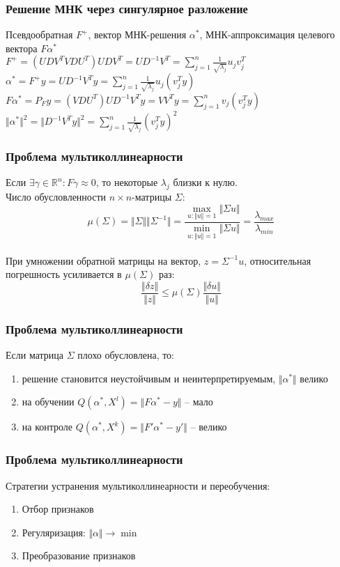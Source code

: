 \documentclass[12pt]{beamer}
\begin{document}
\begin{frame}\frametitle{Решение МНК через сингулярное разложение}
Псевдообратная $F^+$, вектор МНК-решения $\alpha^*$,
МНК-аппроксимация целевого вектора $F\alpha^*$\\
$F^+ = (UDV^TVDU^T)UDV^T = UD^{-1}V^T = \sum\limits_{j=1}^n \frac{1}{\sqrt{\lambda_j}}  u_j v_j^T$\\
$ \alpha^* = F^+y = UD^{-1}V^Ty = \sum\limits_{j=1}^n \frac{1}{\sqrt{\lambda_j}}  u_j (v_j^Ty)$\\
$F \alpha^* = P_F y = (VDU^T)UD^{-1}V^Ty = VV^Ty = \sum\limits_{j=1}^n v_j (v_j^Ty)$\\
$\Vert \alpha^* \Vert^2  = \Vert D^{-1}V^Ty \Vert^2 = \sum\limits_{j=1}^n \frac{1}{\sqrt{\lambda_j}} (v_j^Ty)^2$
\end{frame}

\begin{frame}\frametitle{Проблема мультиколлинеарности}
Если $\exists \gamma \in \mathbb{R}^n: F\gamma \approx 0$, то некоторые $\lambda_j$ близки к нулю.\\
Число обусловленности $n \times n$-матрицы $\Sigma$:
$$\mu(\Sigma) = \Vert \Sigma \Vert \Vert \Sigma^{-1} \Vert = \frac{\max\limits_{u: \Vert u \Vert = 1} \Vert \Sigma u \Vert}{\min\limits_{u: \Vert u \Vert = 1} \Vert \Sigma u \Vert} = \frac{\lambda_{max}}{\lambda_{min}}$$\\
При умножении обратной матрицы на вектор, $z = \Sigma^{-1}u$, относительная погрешность усиливается в $\mu(\Sigma)$ раз:\\
$$\frac{\Vert \delta z \Vert}{\Vert z \Vert } \leq \mu(\Sigma) \frac{\Vert \delta u \Vert}{\Vert u \Vert }$$
\end{frame}

\begin{frame}\frametitle{Проблема мультиколлинеарности}
Если матрица $\Sigma$ плохо обусловлена, то: %
\begin{enumerate}[--]
\item решение становится неустойчивым и неинтерпретируемым, $\Vert \alpha^* \Vert $ велико
\item на обучении $Q(\alpha^*, X^l) = \Vert F\alpha^* -y \Vert$ -- мало   %
\item на контроле $Q(\alpha^*, X^k) = \Vert F'\alpha^* -y' \Vert$ -- велико
\end{enumerate}
\end{frame}

\begin{frame}\frametitle{Проблема мультиколлинеарности}
Стратегии устранения мультиколлинеарности и переобучения:
\begin{enumerate}[--]
\item Отбор признаков
\item Регуляризация: $\Vert \alpha \Vert \rightarrow \min$
\item Преобразование признаков
\end{enumerate}
\end{frame}
\end{document}
